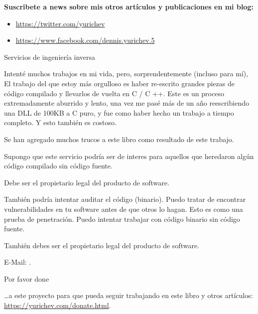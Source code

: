 
\vspace*{\fill}

\normalsize \textbf{Suscribete a news sobre mis otros artículos y publicaciones en mi blog:}

\bigskip
\bigskip
\bigskip

\begin{itemize}

\item \url{https://twitter.com/yurichev}

\item \url{https://www.facebook.com/dennis.yurichev.5}

\end{itemize}

\bigskip
\bigskip
\bigskip
\huge Servicios de ingeniería inversa
\normalsize

\bigskip
\bigskip
\bigskip

Intenté muchos trabajos en mi vida, pero, sorprendentemente (incluso para mí),
El trabajo del que estoy más orgulloso es haber re-escrito grandes piezas de código compilado y llevarlos de vuelta en C / C ++.
Este es un proceso extremadamente aburrido y lento, una vez me pasé más de un año reescribiendo una DLL de 100KB a C puro,
y fue como haber hecho un trabajo a tiempo completo.
Y esto también es costoso.

Se han agregado muchos trucos a este libro como resultado de este trabajo.

Supongo que este servicio podría ser de interes para aquellos que heredaron algún código compilado sin código fuente.

Debe ser el propietario legal del producto de software.

\bigskip

También podría intentar auditar el código (binario).
Puedo tratar de encontrar vulnerabilidades en tu software antes de que otros lo hagan.
Esto es como una prueba de penetración.
Puedo intentar trabajar con código binario sin código fuente.

También debes ser el propietario legal del producto de software.

E-Mail: \GTT{\EMAIL}.

\bigskip
\bigskip
\bigskip

\huge Por favor done
\normalsize

\bigskip
\bigskip
\bigskip

\dots a este proyecto para que pueda seguir trabajando en este libro y otros artículos: \\
\url{https://yurichev.com/donate.html}.

